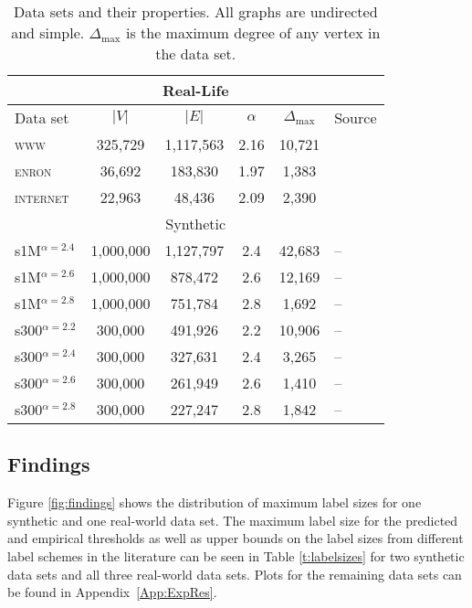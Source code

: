 \documentclass{article}
\theoremstyle{remark}
\begin{document}
\begin{table}[!ht]
\centering
\small
\begin{tabular}{lccccl}\hline
\multicolumn{6}{c}{Real-Life}\\\hline
Data set  & $\vert V \vert$ & $\vert E\vert$ & $\alpha$  & $\Delta_{\max}$ & Source\\\hline
\textsc{www}      & 325,729        & 1,117,563     & 2.16 & 10,721            & \cite{albert1999internet}\\
\textsc{enron}    &  36,692        &   183,830      & 1.97    &1,383         & \cite{leskovec2009community}\\
\textsc{internet} &  22,963        &    48,436      & 2.09     & 2,390        & \cite{newman}\\\hline

\multicolumn{6}{c}{Synthetic}\\\hline
s1M$^{\alpha=2.4}$    & 1,000,000       & 1,127,797      & 2.4    & 42,683 &-- \\
s1M$^{\alpha=2.6}$    & 1,000,000       & 878,472        & 2.6    & 12,169 &-- \\
s1M$^{\alpha=2.8}$    & 1,000,000       & 751,784         & 2.8   & 1,692  &-- \\
s300$^{\alpha=2.2}$    & 300,000        & 491,926        & 2.2    & 10,906 & --\\
s300$^{\alpha=2.4}$    & 300,000        & 327,631        & 2.4    & 3,265 & --\\
s300$^{\alpha=2.6}$    & 300,000        & 261,949        & 2.6    & 1,410 & --\\
s300$^{\alpha=2.8}$    & 300,000        & 227,247        & 2.8    & 1,842 & --\\\hline
\end{tabular}
\caption{Data sets and their properties. All graphs are undirected and simple. $\Delta_{\max}$ is the maximum degree of any vertex in the data set.}
\label{t:datasets}
\end{table}


\subsection{Findings}
Figure \ref{fig:findings} shows the distribution of maximum label sizes for one synthetic and one real-world data set. The maximum label size
for the predicted and empirical thresholds as well as upper bounds on the label sizes from different label schemes in the literature can be seen in Table \ref{t:labelsizes} for two synthetic
data sets and all three real-world data sets. 
Plots for the remaining data sets can be found in Appendix~\ref{App:ExpRes}.
\end{document}
